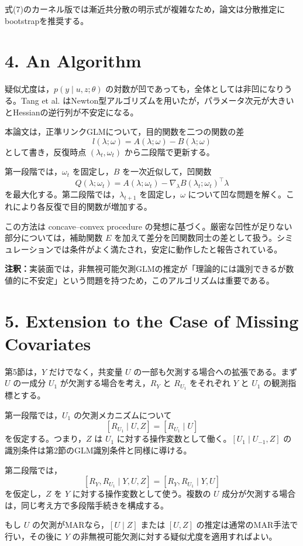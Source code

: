 \documentclass[dvipdfmx,autodetect-engine]{jsarticle}
\newcommand{\note}[1]{\par\smallskip\noindent\textbf{注釈：}#1\par\smallskip}
\begin{document}
式(7)のカーネル版では漸近共分散の明示式が複雑なため，論文は分散推定にbootstrapを推奨する。

\section{4. An Algorithm}

疑似尤度は，$p(y\mid u,z;\theta)$ の対数が凹であっても，全体としては非凹になりうる。Tang et al. はNewton型アルゴリズムを用いたが，パラメータ次元が大きいとHessianの逆行列が不安定になる。

本論文は，正準リンクGLMについて，目的関数を二つの関数の差
\[
l(\lambda;\omega)=A(\lambda;\omega)-B(\lambda;\omega)
\]
として書き，反復時点 $(\lambda_t,\omega_t)$ から二段階で更新する。

第一段階では，$\omega_t$ を固定し，$B$ を一次近似して，凹関数
\[
Q(\lambda;\omega_t)=A(\lambda;\omega_t)-\nabla_\lambda B(\lambda_t;\omega_t)^\top\lambda
\]
を最大化する。第二段階では，$\lambda_{t+1}$ を固定し，$\omega$ について凹な問題を解く。これにより各反復で目的関数が増加する。

この方法は concave--convex procedure の発想に基づく。厳密な凹性が足りない部分については，補助関数 $E$ を加えて差分を凹関数同士の差として扱う。シミュレーションでは条件がよく満たされ，安定に動作したと報告されている。

\note{実装面では，非無視可能欠測GLMの推定が「理論的には識別できるが数値的に不安定」という問題を持つため，このアルゴリズムは重要である。}

\section{5. Extension to the Case of Missing Covariates}

第5節は，$Y$ だけでなく，共変量 $U$ の一部も欠測する場合への拡張である。まず $U$ の一成分 $U_1$ が欠測する場合を考え，$R_Y$ と $R_{U_1}$ をそれぞれ $Y$ と $U_1$ の観測指標とする。

第一段階では，$U_1$ の欠測メカニズムについて
\[
[R_{U_1}\mid U,Z]=[R_{U_1}\mid U]
\]
を仮定する。つまり，$Z$ は $U_1$ に対する操作変数として働く。$[U_1\mid U_{-1},Z]$ の識別条件は第2節のGLM識別条件と同様に導ける。

第二段階では，
\[
[R_Y,R_{U_1}\mid Y,U,Z]=[R_Y,R_{U_1}\mid Y,U]
\]
を仮定し，$Z$ を $Y$ に対する操作変数として使う。複数の $U$ 成分が欠測する場合は，同じ考え方で多段階手続きを構成する。

もし $U$ の欠測がMARなら，$[U\mid Z]$ または $[U,Z]$ の推定は通常のMAR手法で行い，その後に $Y$ の非無視可能欠測に対する疑似尤度を適用すればよい。
\end{document}
